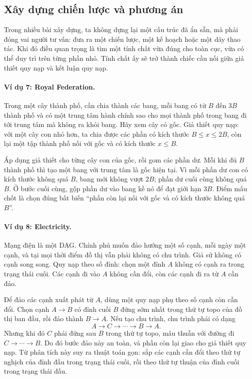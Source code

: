 \documentclass[11pt]{article}
\begin{document}
\subsection{Xây dựng chiến lược và phương án}

Trong nhiều bài xây dựng, ta không dựng lại một cấu trúc đã ẩn sẵn, mà phải
đóng vai người tư vấn: đưa ra một chiến lược, một kế hoạch hoặc một dãy thao
tác. Khi đó điều quan trọng là tìm một tính chất vừa đúng cho toàn cục, vừa
có thể duy trì trên từng phần nhỏ. Tính chất ấy sẽ trở thành chiếc cầu nối
giữa giả thiết quy nạp và kết luận quy nạp.

\paragraph{Ví dụ 7: Royal Federation.}
Trong một cây thành phố, cần chia thành các bang, mỗi bang có từ \(B\) đến
\(3B\) thành phố và có một trung tâm hành chính sao cho mọi thành phố trong
bang đi tới trung tâm mà không ra khỏi bang. Hãy xem cây có gốc. Giả thiết
quy nạp: với một cây con nhỏ hơn, ta chia được các phần có kích thước
\(B\le x\le 2B\), còn lại một tập thành phố nối với gốc và có kích thước
\(x\le B\).

Áp dụng giả thiết cho từng cây con của gốc, rồi gom các phần dư. Mỗi khi đủ
\(B\) thành phố thì tạo một bang với trung tâm là gốc hiện tại. Vì mỗi phần
dư con có kích thước không quá \(B\), bang mới không vượt \(2B\); phần dư
cuối cùng không quá \(B\). Ở bước cuối cùng, gộp phần dư vào bang kề nó để
đạt giới hạn \(3B\). Điểm mấu chốt là chọn đúng bất biến ``phần còn lại nối
với gốc và có kích thước không quá \(B\)''.

\paragraph{Ví dụ 8: Electricity.}
Mạng điện là một DAG. Chính phủ muốn đảo hướng một số cạnh, mỗi ngày một
cạnh, và tại mọi thời điểm đồ thị vẫn phải không có chu trình. Giả sử không
có cạnh song song. Quy nạp theo số đỉnh: chọn một đỉnh \(A\) không có cạnh ra
trong trạng thái cuối. Các cạnh đi vào \(A\) không cần đổi, còn các cạnh đi
ra từ \(A\) cần đảo.

Để đảo các cạnh xuất phát từ \(A\), dùng một quy nạp phụ theo số cạnh còn cần
đổi. Chọn cạnh \(A\to B\) có đỉnh cuối \(B\) đứng sớm nhất trong thứ tự topo
của đồ thị ban đầu, rồi đảo thành \(B\to A\). Nếu tạo chu trình, chu trình
phải có dạng
\[
  A\to C\to \cdots \to B\to A.
\]
Nhưng khi đó \(C\) phải đứng sau \(B\) trong thứ tự topo, mâu thuẫn với đường
đi \(C\to\cdots\to B\). Do đó bước đảo này an toàn, và phần còn lại giao cho
giả thiết quy nạp. Từ phân tích này suy ra thuật toán gọn: sắp các cạnh cần
đổi theo thứ tự nghịch của đỉnh đầu trong trạng thái cuối, rồi theo thứ tự
thuận của đỉnh cuối trong trạng thái đầu.
\end{document}

